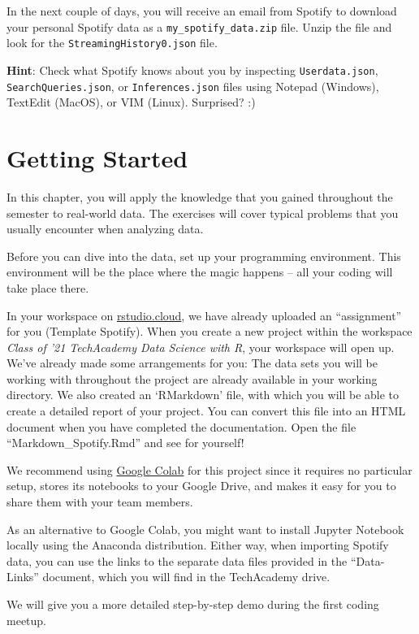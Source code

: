 \documentclass[
  11pt,
]{book}
\newenvironment{tips}[1]
  {
  \begin{itemize}
  \footnotesize
  \renewcommand{\labelitemi}{
    \raisebox{-.7\height}[0pt][0pt]{
      {\setkeys{Gin}{width=3em,keepaspectratio}
        \texttt{[image: images/\#1.png]}}
    }
  }
  \setlength{\fboxsep}{1em}
  \begin{rbox}
  \item
  }
  {
  \end{rbox}
  \end{itemize}
  }
\newenvironment{tipsp}[1]
  {
  \begin{itemize}
  \footnotesize
  \renewcommand{\labelitemi}{
    \raisebox{-.7\height}[0pt][0pt]{
      {\setkeys{Gin}{width=3em,keepaspectratio}
        \texttt{[image: images/\#1.png]}}
    }
  }
  \setlength{\fboxsep}{1em}
  \begin{pbox}
  \item
  }
  {
  \end{pbox}
  \end{itemize}
  }
\begin{document}
In the next couple of days, you will receive an email from Spotify to download your personal Spotify data as a \texttt{my\_spotify\_data.zip} file. Unzip the file and look for the \texttt{StreamingHistory0.json} file.

\textbf{Hint}: Check what Spotify knows about you by inspecting \texttt{Userdata.json}, \texttt{SearchQueries.json}, or \texttt{Inferences.json} files using Notepad (Windows), TextEdit (MacOS), or VIM (Linux). Surprised? :)

\hypertarget{getting-started}{%
\section{Getting Started}\label{getting-started}}

In this chapter, you will apply the knowledge that you gained throughout the semester to real-world data. The exercises will cover typical problems that you usually encounter when analyzing data.

Before you can dive into the data, set up your programming environment. This environment will be the place where the magic happens -- all your coding will take place there.

\begin{tips}r

In your workspace on \href{https://rstudio.cloud/projects}{rstudio.cloud}, we have already uploaded an ``assignment'' for you (Template Spotify). When you create a new project within the workspace \emph{Class of '21 \textbar{} TechAcademy \textbar{} Data Science with R}, your workspace will open up. We've already made some arrangements for you: The data sets you will be working with throughout the project are already available in your working directory. We also created an `RMarkdown' file, with which you will be able to create a detailed report of your project. You can convert this file into an HTML document when you have completed the documentation. Open the file ``Markdown\_Spotify.Rmd'' and see for yourself!

\end{tips}

\begin{tipsp}p

We recommend using \href{https://colab.research.google.com}{Google Colab} for this project since it requires no particular setup, stores its notebooks to your Google Drive, and makes it easy for you to share them with your team members.

As an alternative to Google Colab, you might want to install Jupyter Notebook locally using the Anaconda distribution.
Either way, when importing Spotify data, you can use the links to the separate data files provided in the ``Data-Links'' document, which you will find in the TechAcademy drive.

We will give you a more detailed step-by-step demo during the first coding meetup.

\end{tipsp}
\end{document}
